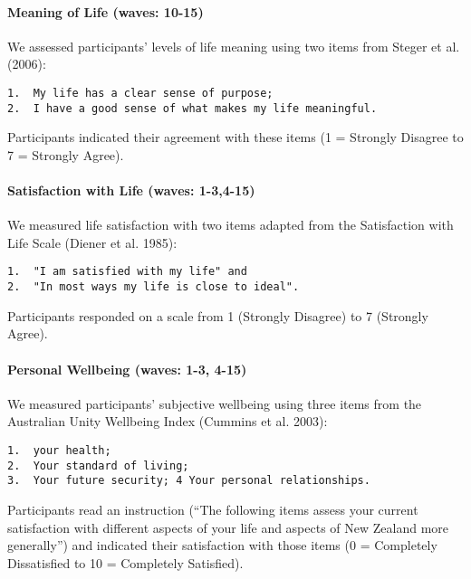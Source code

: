 \documentclass[
  letterpaper,
  DIV=11,
  numbers=noendperiod]{scrartcl}
\let\oldparagraph\paragraph
\renewcommand{\paragraph}[1]{\oldparagraph{#1}\mbox{}}
\begin{document}
\hypertarget{meaning-of-life-waves-10-15}{%
\paragraph{Meaning of Life (waves:
10-15)}\label{meaning-of-life-waves-10-15}}

We assessed participants' levels of life meaning using two items from
Steger et al. (2006):

\begin{verbatim}
1.  My life has a clear sense of purpose;
2.  I have a good sense of what makes my life meaningful.
\end{verbatim}

Participants indicated their agreement with these items (1 = Strongly
Disagree to 7 = Strongly Agree).

\hypertarget{satisfaction-with-life-waves-1-34-15}{%
\paragraph{Satisfaction with Life (waves:
1-3,4-15)}\label{satisfaction-with-life-waves-1-34-15}}

We measured life satisfaction with two items adapted from the
Satisfaction with Life Scale (Diener et al. 1985):

\begin{verbatim}
1.  "I am satisfied with my life" and
2.  "In most ways my life is close to ideal".
\end{verbatim}

Participants responded on a scale from 1 (Strongly Disagree) to 7
(Strongly Agree).

\hypertarget{personal-wellbeing-waves-1-3-4-15}{%
\paragraph{Personal Wellbeing (waves: 1-3,
4-15)}\label{personal-wellbeing-waves-1-3-4-15}}

We measured participants' subjective wellbeing using three items from
the Australian Unity Wellbeing Index (Cummins et al. 2003):

\begin{verbatim}
1.  your health;
2.  Your standard of living;
3.  Your future security; 4 Your personal relationships.
\end{verbatim}

Participants read an instruction (``The following items assess your
current satisfaction with different aspects of your life and aspects of
New Zealand more generally'') and indicated their satisfaction with
those items (0 = Completely Dissatisfied to 10 = Completely Satisfied).
\end{document}
